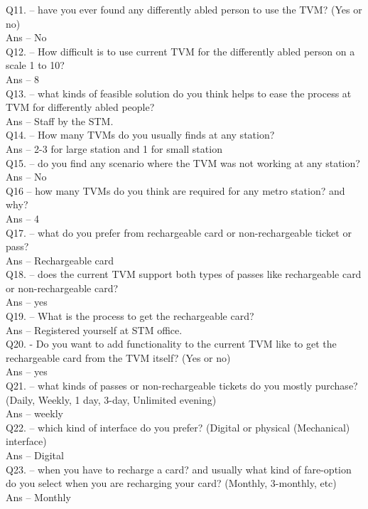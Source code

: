 \documentclass[a4paper, 11pt]{report}
\begin{document}
Q11. – have you ever found any differently abled person to use the TVM? (Yes or no) \\
Ans – No\\
Q12. – How difficult is to use current TVM for the differently abled person on a scale 1 to 10? \\
Ans – 8\\
Q13. – what kinds of feasible solution do you think helps to ease the process at TVM for differently abled people? \\
Ans – Staff by the STM. \\
Q14. – How many TVMs do you usually finds at any station? \\
Ans – 2-3 for large station and 1 for small station\\
Q15. – do you find any scenario where the TVM was not working at any station? \\
Ans – No\\
Q16 – how many TVMs do you think are required for any metro station? and why? \\
Ans – 4\\
Q17. – what do you prefer from rechargeable card or non-rechargeable ticket or pass? \\
Ans – Rechargeable card\\
Q18. – does the current TVM support both types of passes like rechargeable card or non-rechargeable card? \\
Ans – yes\\
Q19. – What is the process to get the rechargeable card? \\
Ans – Registered yourself at STM office. \\
Q20. -  Do you want to add functionality to the current TVM like to get the rechargeable card from the TVM itself? (Yes or no) \\
Ans – yes \\
Q21. – what kinds of passes or non-rechargeable tickets do you mostly purchase? (Daily, Weekly, 1 day, 3-day, Unlimited evening) \\
Ans – weekly \\
Q22. – which kind of interface do you prefer? (Digital or physical (Mechanical) interface) \\
Ans – Digital\\
Q23. – when you have to recharge a card? and usually what kind of fare-option do you select when you are recharging your card? (Monthly, 3-monthly, etc) \\
Ans – Monthly\\
\end{document}
